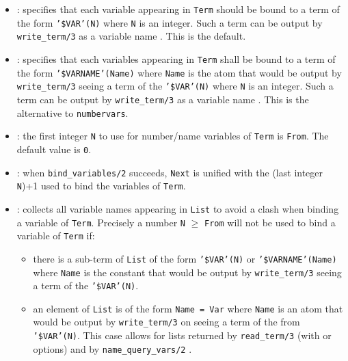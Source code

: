 \begin{itemize}

\item {}: specifies that each variable appearing in
\texttt{Term} should be bound to a term of the form \texttt{'\$VAR'(N)}
where \texttt{N} is an integer. Such a term can be output by
\texttt{write\_term/3} as a variable name . This is
the default.

\item {}: specifies that each variables appearing in
\texttt{Term} shall be bound to a term of the form
\texttt{'\$VARNAME'(Name)} where \texttt{Name} is the atom that would be
output by \texttt{write\_term/3} seeing a term of the \texttt{'\$VAR'(N)}
where \texttt{N} is an integer. Such a term can be output by
\texttt{write\_term/3} as a variable name . This is
the alternative to \texttt{numbervars}.

\item {}: the first integer \texttt{N} to use for
number/name variables of \texttt{Term} is \texttt{From}. The default value
is \texttt{0}.

\item {}: when \texttt{bind\_variables/2} succeeds,
\texttt{Next} is unified with the (last integer \texttt{N})+1 used
to bind the variables of \texttt{Term}. 

\item {}: collects all variable names appearing
in \texttt{List} to avoid a clash when binding a variable of \texttt{Term}.
Precisely a number \texttt{N} $\geq$ \texttt{From} will not be used to bind a
variable of \texttt{Term} if:

\begin{itemize}

\item there is a sub-term of \texttt{List} of the form \texttt{'\$VAR'(N)}
or \texttt{'\$VARNAME'(Name)} where \texttt{Name} is the constant that would
be output by \texttt{write\_term/3} seeing a term of the
\texttt{'\$VAR'(N)}.

\item an element of \texttt{List} is of the form \texttt{Name = Var} where
\texttt{Name} is an atom that would be output by \texttt{write\_term/3} on
seeing a term of the from \texttt{'\$VAR'(N)}. This case allows for lists
returned by \texttt{read\_term/3}
(with  or
 options)  and by
\texttt{name\_query\_vars/2} .

\end{itemize}

\end{itemize}

